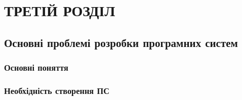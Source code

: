 ﻿\section{ТРЕТІЙ РОЗДІЛ}
\subsection{Основні проблемі розробки програмних систем}
\subsubsection{Основні поняття}
\subsubsection{Необхідність створення ПС}

